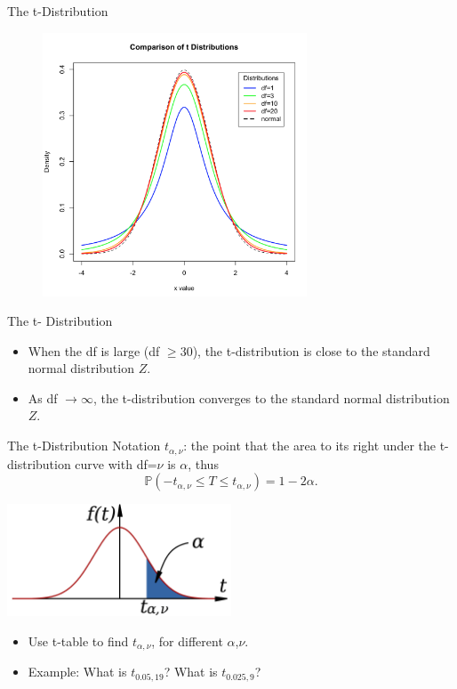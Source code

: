 \documentclass{beamer}
\newcommand{\pr}{\mathbb{P}}
\begin{document}
\begin{frame}{The t-Distribution}
\begin{figure}
    \includegraphics[width=0.7\textwidth]{figures/t_pdf.png}
\end{figure}
\end{frame}

\begin{frame}{The t- Distribution}
\begin{itemize}
\item When the df is large (df $\geq 30$), the t-distribution is close to the standard normal distribution $Z$.
\item As df $\to\infty$, the t-distribution converges to the standard normal distribution $Z$.
\end{itemize}
\end{frame}

\begin{frame}{The t-Distribution}
Notation $t_{\alpha,\nu}$: the point that the area to its right under the t-distribution curve with df=$\nu$ is $\alpha$, thus
$$\pr(-t_{\alpha,\nu} \leq T \leq t_{\alpha,\nu}) = 1-2\alpha.$$
\begin{center}
    \includegraphics[width=0.5\textwidth]{figures/t_tail.png}
\end{center}

\begin{itemize}
\item Use t-table to find $t_{\alpha,\nu}$, for different $\alpha$,$\nu$.
\item Example: What is $t_{0.05, 19}$?  What is $t_{0.025, 9}$? 
\end{itemize}
\end{frame}
\end{document}
